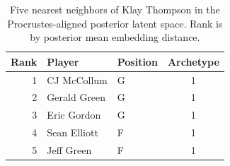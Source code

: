 \begin{table}[htbp]
  \centering\small
  \begin{tabular}{rllc}
    \toprule
    Rank & Player & Position & Archetype \\
    \midrule
    1 & CJ McCollum & G & 1 \\
    2 & Gerald Green & G & 1 \\
    3 & Eric Gordon & G & 1 \\
    4 & Sean Elliott & F & 1 \\
    5 & Jeff Green & F & 1 \\
    \bottomrule
  \end{tabular}
  \caption{Five nearest neighbors of Klay Thompson in the Procrustes-aligned posterior latent space. Rank is by posterior mean embedding distance.}
  \label{tab:Klay_Thompson_neighbors}
\end{table}

